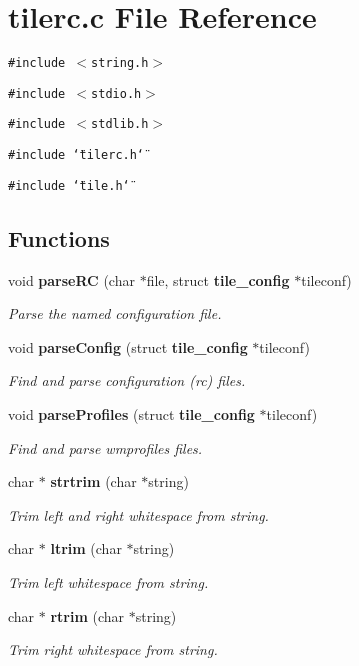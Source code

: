 \section{tilerc.c File Reference}
\label{tilerc_8c}
{\tt \#include $<$string.h$>$}\par
{\tt \#include $<$stdio.h$>$}\par
{\tt \#include $<$stdlib.h$>$}\par
{\tt \#include \char`\"{}tilerc.h\char`\"{}}\par
{\tt \#include \char`\"{}tile.h\char`\"{}}\par
\subsection*{Functions}
\begin{CompactItemize}
\item 
void {\bf parse\-RC} (char $\ast$file, struct {\bf tile\_\-config} $\ast$tileconf)
\begin{CompactList}\small\item\em Parse the named configuration file. \item\end{CompactList}\item 
void {\bf parse\-Config} (struct {\bf tile\_\-config} $\ast$tileconf)
\begin{CompactList}\small\item\em Find and parse configuration (rc) files. \item\end{CompactList}\item 
void {\bf parse\-Profiles} (struct {\bf tile\_\-config} $\ast$tileconf)
\begin{CompactList}\small\item\em Find and parse wmprofiles files. \item\end{CompactList}\item 
char $\ast$ {\bf strtrim} (char $\ast$string)
\begin{CompactList}\small\item\em Trim left and right whitespace from string. \item\end{CompactList}\item 
char $\ast$ {\bf ltrim} (char $\ast$string)
\begin{CompactList}\small\item\em Trim left whitespace from string. \item\end{CompactList}\item 
char $\ast$ {\bf rtrim} (char $\ast$string)
\begin{CompactList}\small\item\em Trim right whitespace from string. \item\end{CompactList}\end{CompactItemize}


